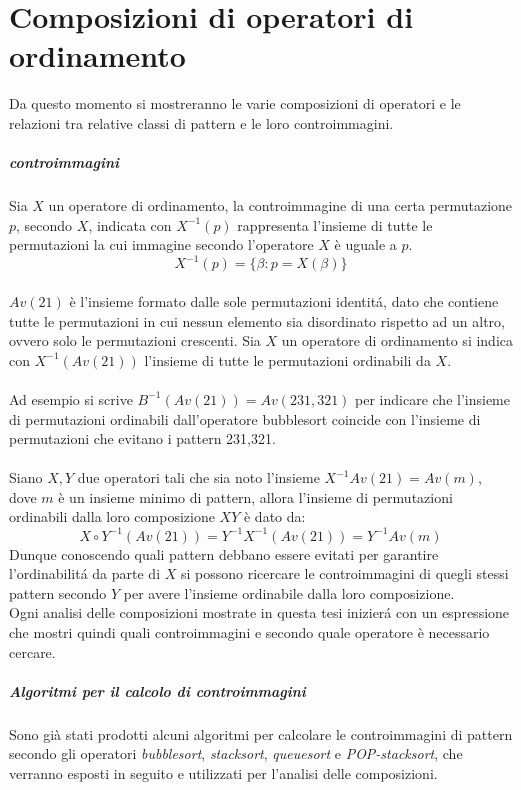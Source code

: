 \chapter{Composizioni di operatori di ordinamento}
Da questo momento si mostreranno le varie composizioni di operatori e le relazioni tra relative classi di pattern e le loro controimmagini.
\paragraph*{controimmagini} Sia $X$ un operatore di ordinamento, la controimmagine di una certa permutazione $p$, secondo $X$, indicata con $X^{-1}(p)$ rappresenta l'insieme di tutte le permutazioni la cui immagine secondo l'operatore $X$ \`e uguale a $p$.$$X^{-1}(p) = \{\beta : p = X(\beta)\}$$\\
$Av(21)$ \`e l'insieme formato dalle sole permutazioni identit\'a, dato che contiene tutte le permutazioni in cui nessun elemento sia disordinato rispetto ad un altro, ovvero solo le permutazioni crescenti. Sia $X$ un operatore di ordinamento si indica con $X^{-1}(Av(21))$ l'insieme di tutte le permutazioni ordinabili da $X$.\\\\
Ad esempio si scrive $B^{-1}(Av(21)) = Av(231,321)$ per indicare che l'insieme di permutazioni ordinabili dall'operatore bubblesort coincide con l'insieme di permutazioni che evitano i pattern 231,321\cite{claesson2012sorting}.
\\\\
Siano $X,Y$ due operatori tali che sia noto l'insieme $X^{-1}Av(21) = Av(m)$, dove $m$ \`e un insieme minimo di pattern, allora l'insieme di permutazioni ordinabili dalla loro composizione $XY$ \`e dato da:
$$X\circ Y^{-1}(Av(21)) = Y^{-1}X^{-1}(Av(21)) = Y^{-1}Av(m)$$ 
Dunque conoscendo quali pattern debbano essere evitati per garantire l'ordinabilit\'a da parte di $X$ si possono ricercare le controimmagini di quegli stessi pattern secondo $Y$ per avere l'insieme ordinabile dalla loro composizione.\\Ogni analisi delle composizioni mostrate in questa tesi inizier\'a con un espressione che mostri quindi quali controimmagini e secondo quale operatore \`e necessario cercare.
\paragraph*{Algoritmi per il calcolo di controimmagini} Sono gi\`a stati prodotti alcuni algoritmi per calcolare le controimmagini di pattern secondo gli operatori \textit{bubblesort}\cite{albert2010inverse}, \textit{stacksort}\cite{claesson2012sorting}, \textit{queuesort}\cite{magnusson2013sorting} e \textit{POP-stacksort}\cite{magnusson2013sorting}, che verranno esposti in seguito e utilizzati per l'analisi delle composizioni.
